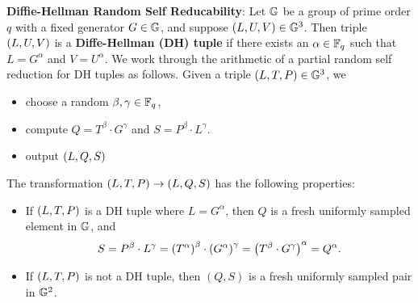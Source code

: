 \noindent \textbf{Diffie-Hellman Random Self Reducability}: 
Let $ \mathbb{G} $ be a group of prime order $q$ with a fixed generator $G \in \mathbb{G}$, and suppose $\left(L, U, V\right) \in \mathbb{G}^3$. Then triple $\left(L,U,V\right)$ is a \textbf{Diffe-Hellman (DH) tuple} if there exists an $\alpha \in \mathbb{F}_q$ such that $L = G^\alpha$ and $V = U^\alpha$.
\noindent
We work through the arithmetic of a partial random self reduction for DH tuples as follows. Given a triple $\left(L, T, P\right) \in \mathbb{G}^3$, we
\begin{itemize}
	\item choose a random $\beta, \gamma \in \mathbb{F}_q$,
	\item compute $Q = T^\beta \cdot G^\gamma$ and $S = P^\beta \cdot L^\gamma$.
	\item output $\left(L,Q,S\right)$
\end{itemize}
The transformation $\left(L, T, P\right) \to \left(L, Q, S\right)$ has the following properties:
\begin{itemize}
	\item If $\left(L, T, P\right)$ is a DH tuple where $L = G^\alpha$, then $Q$ is a fresh uniformly sampled element in $\mathbb{G}$, and 
	\begin{align*}
	S =  P^\beta \cdot L^\gamma = \left(T^\alpha\right)^\beta \cdot \left(G^\alpha\right)^\gamma =  \left(T^\beta \cdot G^\gamma\right)^\alpha = Q^\alpha.
	\end{align*}
	\item If $\left(L, T, P\right)$ is not a DH tuple, then  $(Q,S)$ is a fresh uniformly sampled pair in $\mathbb{G}^2$.
\end{itemize}
